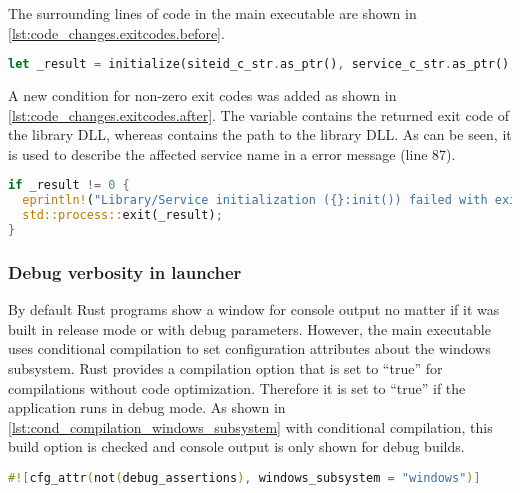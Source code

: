 The surrounding lines of code in the main executable are shown in \autoref{lst:code_changes.exitcodes.before}.
\begin{lstlisting}[label=lst:code_changes.exitcodes.before, caption={Former code snippet from main executable for calling the microservice library code in Rust (\textit{/Microservices/OpenTwin/src/main.rs})}, language=rust, firstnumber=85]
let _result = initialize(siteid_c_str.as_ptr(), service_c_str.as_ptr(), db_c_str.as_ptr(), dir_c_str.as_ptr());
\end{lstlisting}

A new condition for non-zero exit codes was added as shown in \autoref{lst:code_changes.exitcodes.after}. The variable   contains the returned exit code of the library \ac{DLL}, whereas  contains the path to the library \ac{DLL}. As can be seen, it is used to describe the affected service name in a error message (line 87).
\begin{lstlisting}[label=lst:code_changes.exitcodes.after, caption={Code changes in Rust main executable for additional treatment of exit codes (\textit{/Microservices/OpenTwin/src/main.rs})}, language=rust, firstnumber=86]
if _result != 0 {
  eprintln!("Library/Service initialization ({}:init()) failed with exit code {}", lib_path, _result);
  std::process::exit(_result);
}
\end{lstlisting}

 
\subsubsection*{Debug verbosity in launcher}
By default Rust programs show a window for console output no matter if it was built in release mode or with debug parameters. However, the main executable uses conditional compilation to set configuration attributes about the windows subsystem.
Rust provides a compilation option  that is set to \enquote{true} for compilations without code optimization\cite{Rust.20230209}. Therefore it is set to \enquote{true} if the application runs in debug mode. As shown in \autoref{lst:cond_compilation_windows_subsystem} with conditional compilation, this build option is checked and console output is only shown for debug builds.
\begin{lstlisting}[label=lst:cond_compilation_windows_subsystem, caption={Conditional compilation for disabling console output in non-debug builds (\textit{/Microservices/OpenTwin/src/main.rs})}, language=rust, firstnumber=2]
#![cfg_attr(not(debug_assertions), windows_subsystem = "windows")]
\end{lstlisting}

